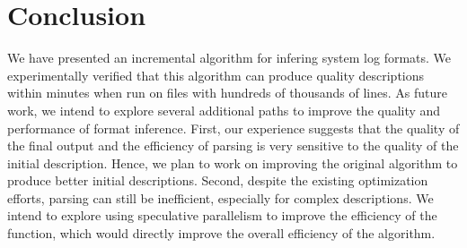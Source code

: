\section{Conclusion}
\label{sec:conclude}
We have presented an incremental algorithm for infering system log
formats.  We experimentally verified that this algorithm can produce
quality descriptions within minutes when run on files with hundreds of
thousands of lines.  As future work, we intend to explore several
additional paths to improve the quality and performance of format
inference. First, our experience suggests that the quality of
the final output and the efficiency of parsing is very sensitive to
the quality of the initial description.  Hence, we plan to work on
improving the original \learnpads{} algorithm to produce better
initial descriptions. Second, despite the existing optimization
efforts, parsing can still be inefficient, especially for 
complex descriptions.  We intend to explore using speculative
parallelism to improve the efficiency of the  function,
which would directly improve the overall efficiency of the algorithm.


 

